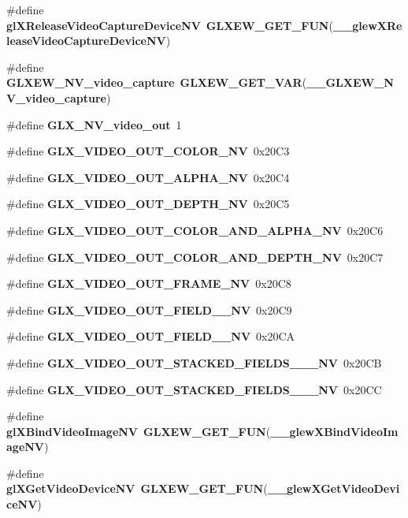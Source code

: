 \begin{DoxyCompactItemize}
\item 
\#define {\bf gl\+X\+Release\+Video\+Capture\+Device\+NV}~{\bf G\+L\+X\+E\+W\+\_\+\+G\+E\+T\+\_\+\+F\+UN}({\bf \+\_\+\+\_\+glew\+X\+Release\+Video\+Capture\+Device\+NV})
\item 
\#define {\bf G\+L\+X\+E\+W\+\_\+\+N\+V\+\_\+video\+\_\+capture}~{\bf G\+L\+X\+E\+W\+\_\+\+G\+E\+T\+\_\+\+V\+AR}({\bf \+\_\+\+\_\+\+G\+L\+X\+E\+W\+\_\+\+N\+V\+\_\+video\+\_\+capture})
\item 
\#define {\bf G\+L\+X\+\_\+\+N\+V\+\_\+video\+\_\+out}~1
\item 
\#define {\bf G\+L\+X\+\_\+\+V\+I\+D\+E\+O\+\_\+\+O\+U\+T\+\_\+\+C\+O\+L\+O\+R\+\_\+\+NV}~0x20\+C3
\item 
\#define {\bf G\+L\+X\+\_\+\+V\+I\+D\+E\+O\+\_\+\+O\+U\+T\+\_\+\+A\+L\+P\+H\+A\+\_\+\+NV}~0x20\+C4
\item 
\#define {\bf G\+L\+X\+\_\+\+V\+I\+D\+E\+O\+\_\+\+O\+U\+T\+\_\+\+D\+E\+P\+T\+H\+\_\+\+NV}~0x20\+C5
\item 
\#define {\bf G\+L\+X\+\_\+\+V\+I\+D\+E\+O\+\_\+\+O\+U\+T\+\_\+\+C\+O\+L\+O\+R\+\_\+\+A\+N\+D\+\_\+\+A\+L\+P\+H\+A\+\_\+\+NV}~0x20\+C6
\item 
\#define {\bf G\+L\+X\+\_\+\+V\+I\+D\+E\+O\+\_\+\+O\+U\+T\+\_\+\+C\+O\+L\+O\+R\+\_\+\+A\+N\+D\+\_\+\+D\+E\+P\+T\+H\+\_\+\+NV}~0x20\+C7
\item 
\#define {\bf G\+L\+X\+\_\+\+V\+I\+D\+E\+O\+\_\+\+O\+U\+T\+\_\+\+F\+R\+A\+M\+E\+\_\+\+NV}~0x20\+C8
\item 
\#define {\bf G\+L\+X\+\_\+\+V\+I\+D\+E\+O\+\_\+\+O\+U\+T\+\_\+\+F\+I\+E\+L\+D\+\_\+\_\+\+NV}~0x20\+C9
\item 
\#define {\bf G\+L\+X\+\_\+\+V\+I\+D\+E\+O\+\_\+\+O\+U\+T\+\_\+\+F\+I\+E\+L\+D\+\_\+\_\+\+NV}~0x20\+CA
\item 
\#define {\bf G\+L\+X\+\_\+\+V\+I\+D\+E\+O\+\_\+\+O\+U\+T\+\_\+\+S\+T\+A\+C\+K\+E\+D\+\_\+\+F\+I\+E\+L\+D\+S\+\_\+\_\+\_\+\+NV}~0x20\+CB
\item 
\#define {\bf G\+L\+X\+\_\+\+V\+I\+D\+E\+O\+\_\+\+O\+U\+T\+\_\+\+S\+T\+A\+C\+K\+E\+D\+\_\+\+F\+I\+E\+L\+D\+S\+\_\+\_\+\_\+\+NV}~0x20\+CC
\item 
\#define {\bf gl\+X\+Bind\+Video\+Image\+NV}~{\bf G\+L\+X\+E\+W\+\_\+\+G\+E\+T\+\_\+\+F\+UN}({\bf \+\_\+\+\_\+glew\+X\+Bind\+Video\+Image\+NV})
\item 
\#define {\bf gl\+X\+Get\+Video\+Device\+NV}~{\bf G\+L\+X\+E\+W\+\_\+\+G\+E\+T\+\_\+\+F\+UN}({\bf \+\_\+\+\_\+glew\+X\+Get\+Video\+Device\+NV})
\item 

\end{DoxyCompactItemize}
